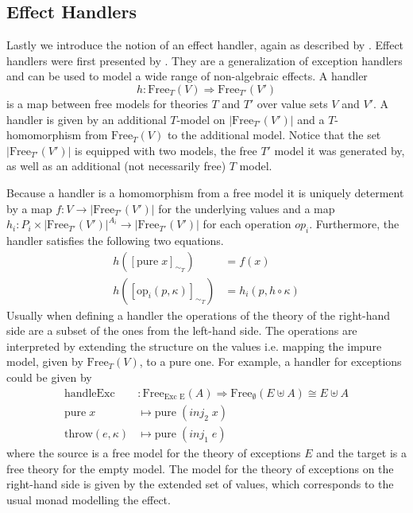 \subsection{Effect Handlers}
\label{preliminaries:handler}

Lastly we introduce the notion of an effect handler, again as described by
\textcite{DBLP:journals/corr/abs-1807-05923}.
Effect handlers  were first presented by \textcite{DBLP:conf/esop/PlotkinP09}.
They are a generalization of exception handlers and can be used to model a wide
range of non-algebraic effects.
A handler
\[
  h : \mathrm{Free}_{T}(V) \Rightarrow \mathrm{Free}_{T'}(V')
\]
is a map between free models for theories $T$ and $T'$ over value sets $V$ and
$V'$.
A handler is given by an additional $T$-model on $|\mathrm{Free}_{T'}(V')|$ and
a $T$-homomorphism from $\mathrm{Free}_{T}(V)$ to the additional model.
Notice that the set $|\mathrm{Free}_{T'}(V')|$ is equipped with two models, the
free $T'$ model it was generated by, as well as an additional (not necessarily
free) $T$ model.

Because a handler is a homomorphism from a free model it is uniquely determent
by a map $f : V \rightarrow |\mathrm{Free}_{T'}(V')|$ for the underlying
values and a map $h_i : P_i \times |\mathrm{Free}_{T'}(V')|^{A_i} \rightarrow
|\mathrm{Free}_{T'}(V')|$ for each operation $op_i$.
Furthermore, the handler satisfies the following two equations.
\begin{align*}
  h([\mathrm{pure}\;x]_{\sim_T}) &= f(x) \\
  h([\mathrm{op}_i(p,\kappa)]_{\sim_T}) &= h_i(p, h\circ\kappa )
\end{align*}
Usually when defining a handler the operations of the theory of the right-hand
side are a subset of the ones from the left-hand side.
The operations are interpreted by extending the structure on the values i.e.
mapping the impure model, given by $\mathrm{Free}_T(V)$, to a pure one.
For example, a handler for exceptions could be given by
\begin{align*}
  \mathrm{handleExc} &: \mathrm{Free}_{\text{Exc E}}(A) \Rightarrow
  \mathrm{Free}_\emptyset(E \uplus A) \cong E \uplus A \\
  \mathrm{pure}\;x&\mapsto \mathrm{pure}\; (inj_2\; x) \\
  \mathrm{throw}(e, \kappa)&\mapsto \mathrm{pure}\; (inj_1\; e) 
\end{align*}
where the source is a free model for the theory of exceptions $E$ and the target
is a free theory for the empty model.
The model for the theory of exceptions on the right-hand side is given by the
extended set of values, which corresponds to the usual monad modelling the
effect.

